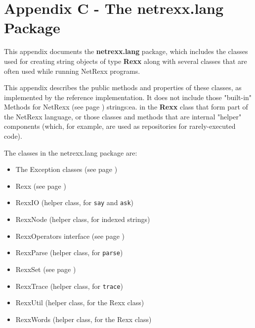 \chapter{Appendix C - The netrexx.lang Package}\label{refappc}
 
This appendix documents the \textbf{netrexx.lang}
package, which includes the classes used for creating string objects of
type \textbf{Rexx} along with several classes that are often used
while running NetRexx programs.
 
This appendix describes the public methods and properties of these
classes, as implemented by the reference implementation.  It does not
include those "built-in"  Methods for NetRexx (see page \pageref{refbmeth}) 
strings:ea. in the \textbf{Rexx} class that form part of the
NetRexx language, or those classes and methods that are internal
"helper" components (which, for example, are used as
repositories for rarely-executed code).
 
The classes in the netrexx.lang package are:
\begin{itemize}
\item The  Exception classes (see page \pageref{refnlexcep}) 
\item  Rexx (see page \pageref{refnlrexx}) 
\item RexxIO (helper class, for \texttt{say} and \texttt{ask})
\item RexxNode (helper class, for indexed strings)
\item  RexxOperators interface (see page \pageref{refnlrops}) 
\item RexxParse (helper class, for \texttt{parse})
\item  RexxSet (see page \pageref{refnlrset}) 
\item RexxTrace (helper class, for \texttt{trace})
\item RexxUtil (helper class, for the Rexx class)
\item RexxWords (helper class, for the Rexx class)
\end{itemize}
